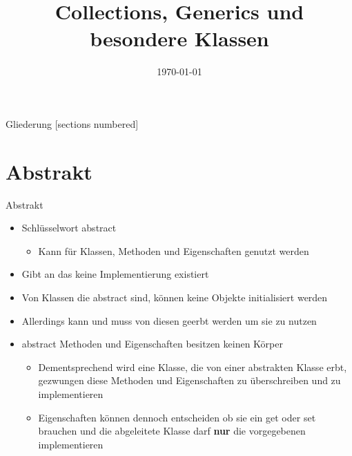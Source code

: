 



\title{Collections, Generics und besondere Klassen}
\date{\today}




\maketitle

\begin{frame}{Gliederung}
	[sections numbered]
	\tableofcontents
\end{frame}

\section{Abstrakt}
\begin{frame}{Abstrakt}
	\begin{itemize}
		\item Schlüsselwort \alert{abstract}
		\begin{itemize}
			\item Kann für Klassen, Methoden und Eigenschaften genutzt werden		
		\end{itemize}
		\item Gibt an das keine Implementierung existiert
		\item Von Klassen die \alert{abstract} sind, können keine Objekte initialisiert werden
		\item Allerdings kann und muss von diesen geerbt werden um sie zu nutzen
		\item \alert{abstract} Methoden und Eigenschaften besitzen keinen Körper
		\begin{itemize}
			\item Dementsprechend wird eine Klasse, die von einer abstrakten Klasse erbt, gezwungen diese Methoden und Eigenschaften zu überschreiben und zu implementieren
			\item Eigenschaften können dennoch entscheiden ob sie ein \alert{get} oder \alert{set} brauchen und die abgeleitete Klasse darf \textbf{nur} die vorgegebenen implementieren
		\end{itemize}
	\end{itemize}
\end{frame}

